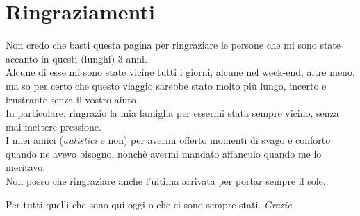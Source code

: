 
\chapter*{Ringraziamenti}

Non credo che basti questa pagina per ringraziare le persone che mi sono state accanto in questi (lunghi) 3 anni.\\
Alcune di esse mi sono state vicine tutti i giorni, alcune nel week-end, altre meno, ma so per certo che questo viaggio sarebbe stato molto più lungo, incerto e frustrante senza il vostro aiuto.
\\

\noindent In particolare, ringrazio la mia famiglia per essermi stata sempre vicino, senza mai mettere pressione.\\
I miei amici (\emph{autistici} e non) per avermi offerto momenti di svago e conforto quando ne avevo bisogno, nonchè avermi mandato affanculo quando me lo meritavo.
\\
Non posso che ringraziare anche l'ultima arrivata per portar sempre il sole.
\\
\vspace{0.3cm}
\begin{center}
Per tutti quelli che sono qui oggi o che ci sono sempre stati. \textit{Grazie}
\end{center}


